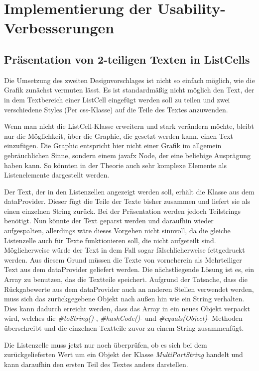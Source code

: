 \chapter{Implementierung der Usability-Verbesserungen}
\section{Präsentation von 2-teiligen Texten in ListCells} \label{sec:verbListCell}
Die Umsetzung des zweiten Designvorschlages ist nicht so einfach möglich, wie die Grafik zunächst vermuten lässt. Es ist standardmäßig nicht möglich den Text, der in dem Textbereich einer ListCell eingefügt werden soll zu teilen und zwei verschiedene Styles (Per \gls{css}-Klasse) auf die Teile des Textes anzuwenden.

Wenn man nicht die ListCell-Klasse erweitern und stark verändern möchte, bleibt nur die Möglichkeit, über die Graphic, die gesetzt werden kann, einen Text einzufügen. Die Graphic entspricht hier nicht einer Grafik im allgemein gebräuchlichen Sinne, sondern einem \gls{javafx} Node, der eine beliebige Ausprägung haben kann. So könnten in der Theorie auch sehr komplexe Elemente als Listenelemente dargestellt werden.

Der Text, der in den Listenzellen angezeigt werden soll, erhält die Klasse aus dem \gls{dataProvider}. Dieser fügt die Teile der Texte bisher zusammen und liefert sie als einen einzelnen String zurück. Bei der Präsentation werden jedoch Teilstrings benötigt. Nun könnte der Text geparst werden und daraufhin wieder aufgespalten, allerdings wäre dieses Vorgehen nicht sinnvoll, da die gleiche Listenzelle auch für Texte funktionieren soll, die nicht aufgeteilt sind. Möglicherweise würde der Text in dem Fall sogar fälschlicherweise fettgedruckt werden. Aus diesem Grund müssen die Texte von vorneherein als Mehrteiliger Text aus dem \gls{dataProvider} geliefert werden. Die nächstliegende Lösung ist es, ein Array zu benutzen, das die Textteile speichert. Aufgrund der Tatsache, dass die Rückgabewerte aus dem \gls{dataProvider} auch an anderen Stellen verwendet werden, muss sich das zurückgegebene Objekt nach außen hin wie ein String verhalten. Dies kann dadurch erreicht werden, dass das Array in ein neues Objekt verpackt wird, welches die \textit{\#toString()}-, \textit{\#hashCode()}- und \textit{\#equals(Object)}- Methoden überschreibt und die einzelnen Textteile zuvor zu einem String zusammenfügt.

Die Listenzelle muss jetzt nur noch überprüfen, ob es sich bei dem zurückgelieferten Wert um ein Objekt der Klasse \textit{MultiPartString} handelt und kann daraufhin den ersten Teil des Textes anders darstellen.

